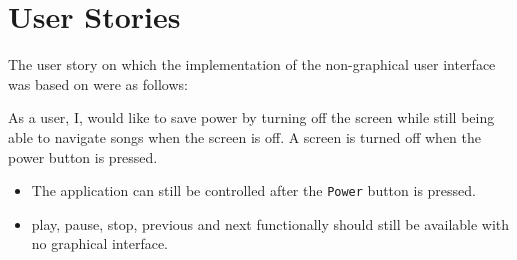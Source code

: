 \section{User Stories}
The user story on which the implementation of the non-graphical user interface was based on were as follows:

{As a user, I, would like to save power by turning off the screen while still being able to navigate songs when the screen is off.
A screen is turned off when the power button is pressed.}
{\begin{itemize}
\item The application can still be controlled after the \texttt{Power} button is pressed.
\item play, pause, stop, previous and next functionally should still be available with no graphical interface.
\end{itemize}}
